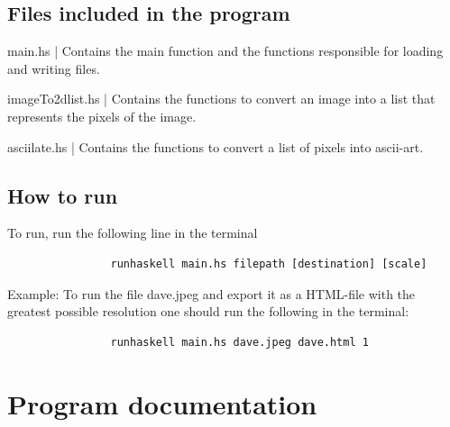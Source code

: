 \documentclass[12pt, a4paper]{article}
\begin{document}

		\subsection{Files included in the program }

		main.hs | Contains the main function and the functions responsible for loading and writing files.

		imageTo2dlist.hs | Contains the functions to convert an image into a list that represents the pixels of the image.

		asciilate.hs | Contains the functions to convert a list of pixels into ascii-art.

		\subsection{How to run}

		To run, run the following line in the terminal
		\begin{footnotesize}
			\begin{verbatim}
				runhaskell main.hs filepath [destination] [scale]
			\end{verbatim}
		\end{footnotesize}

		Example: To run the file dave.jpeg and export it as a HTML-file with the greatest possible resolution one should run the following in the terminal:

		\begin{footnotesize}
			\begin{verbatim}
				runhaskell main.hs dave.jpeg dave.html 1
			\end{verbatim}
		\end{footnotesize}

	\section{Program documentation}



\end{document}
